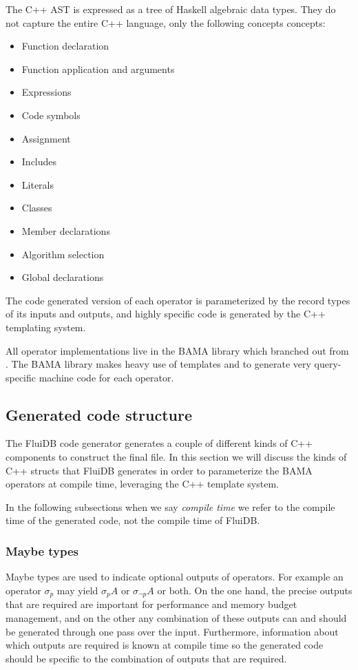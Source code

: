 The C++ AST is expressed as a tree of Haskell algebraic data
types. They do not capture the entire C++ language, only the following
concepts concepts:

\begin{itemize}
\item Function declaration
\item Function application and arguments
\item Expressions
\item Code symbols
\item Assignment
\item Includes
\item Literals
\item Classes
\item Member declarations
\item Algorithm selection
\item Global declarations
\end{itemize}

The code generated version of each operator is parameterized by the
record types of its inputs and outputs, and highly specific code is
generated by the C++ templating system.

All operator implementations live in the BAMA library which branched
out from \cite{krikellasGeneratingCodeHolistic2010}. The BAMA library
makes heavy use of templates and  to generate very
query-specific machine code for each operator.

\subsection{Generated code structure}

The FluiDB code generator generates a couple of different kinds of C++
components to construct the final file. In this section we will
discuss the kinds of C++ structs that FluiDB generates in order to
parameterize the BAMA operators at compile time, leveraging the C++
template system.

In the following subsections when we say \emph{compile time} we refer to
the compile time of the generated code, not the compile time of FluiDB.

\subsubsection{Maybe types}

Maybe types are used to indicate optional outputs of operators. For
example an operator \(\sigma_p\) may yield \(\sigma_p A\) or
\(\sigma_{\neg p} A\) or both. On the one hand, the precise outputs that
are required are important for performance and memory budget
management, and on the other any combination of these outputs can and
should be generated through one pass over the input. Furthermore,
information about which outputs are required is known at compile time
so the generated code should be specific to the combination of outputs
that are required.

